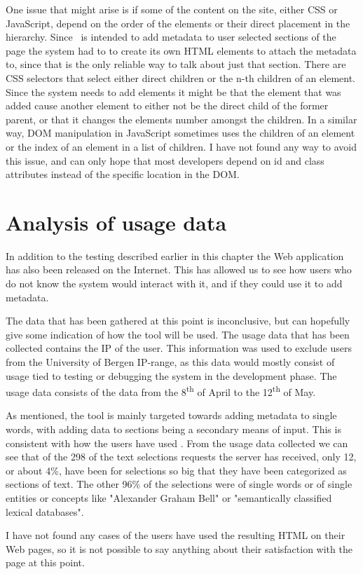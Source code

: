 One issue that might arise is if some of the content on the site, either CSS or JavaScript,
depend on the order of the elements or their direct placement in the hierarchy.
Since \theartefact\ is intended to add metadata to user selected sections of the page the system had to  to create its own
HTML elements to attach the metadata to, since that is the only reliable way to talk about just that section.
There are CSS selectors that select either direct children or the n-th children of an element.
Since the system needs to add elements it might be that the element that was added cause another element to either not be the direct
child of the former parent, or that it changes the elements number amongst the children.
In a similar way, DOM manipulation in JavaScript sometimes uses the children of an element or the index of an element
in a list of children.
I have not found any way to avoid this issue,
and can only hope that most developers depend on id and class attributes instead of the specific location in the DOM.

\section{Analysis of usage data}
In addition to the testing described earlier in this chapter the Web application  has also been released on the Internet.
This has allowed us to see how users who do not know the system would interact with it,
and if they could use it to add metadata.

The data that has been gathered at this point is inconclusive, but can hopefully give some indication of how the tool will be used.
The usage data that has been collected contains the IP of the user.
This information was used to exclude users from the University of Bergen IP-range,
as this data would mostly consist of usage tied to testing or debugging the system in the development phase.
The usage data consists of the data from the 8\textsuperscript{th}	 of April to the 12\textsuperscript{th} of May.

As mentioned, the tool is mainly targeted towards adding metadata to single words, with adding data to sections being
a secondary means of input.
This is consistent with how the users have used \theartefact.
From the usage data collected we can see that of the 298 of the text selections requests the server has received,
only 12, or about 4\%, have been for selections so big that they have been categorized as sections of text.
The other 96\% of the selections were of single words or of single entities or concepts like "Alexander Graham Bell" or
"semantically classified lexical databases".

I have not found any cases of the users have used the resulting HTML on their Web pages,
so it is not possible to say anything about their satisfaction with the page at this point.
